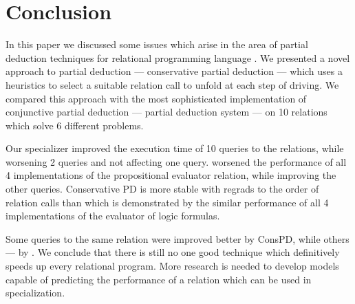 \section{Conclusion}

In this paper we discussed some issues which arise in the area of partial deduction techniques for relational programming language \mk.
We presented a novel approach to partial deduction --- conservative partial deduction --- which uses a heuristics to select a suitable relation call to unfold at each step of driving.
We compared this approach with the most sophisticated implementation of conjunctive partial deduction --- \ecce partial deduction system --- on 10 relations which solve 6 different problems.

Our specializer improved the execution time of 10 queries to the  relations, while worsening 2 queries and not affecting one query.
\ecce worsened the performance of all 4 implementations of the propositional evaluator relation, while improving the other queries.
Conservative PD is more stable with regrads to the order of relation calls than \ecce which is demonstrated by the similar performance of all 4 implementations of the evaluator of logic formulas.

Some queries to the same relation were improved better by ConsPD, while others --- by \ecce.
We conclude that there is still no one good technique which definitively speeds up every relational program.
More research is needed to develop models capable of predicting the performance of a relation which can be used in specialization.
